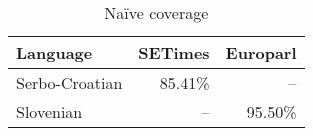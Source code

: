 \begin{table}
\begin{tabular}{lrr}

\textbf{Language} & \textbf{SETimes} & \textbf{Europarl}\\
\hline
Serbo-Croatian & 85.41\% & -- \\
Slovenian &  -- & 95.50\%\\
\hline
\end{tabular}
\caption{ Naïve coverage }
\label{table:coverage}
\end{table}

